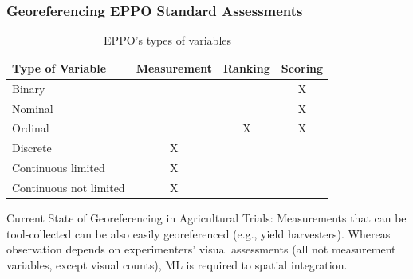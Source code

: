 \documentclass[aspectratio=43]{beamer}
\begin{document}
\begin{frame}
    \frametitle{Georeferencing EPPO Standard Assessments}
    
    \begin{table}[ht]
        \caption{\small EPPO's types of variables}
        \label{tab:data_types_slide}
        \centering
        \begin{tabular}{|l|c|c|c|}
        \hline
        \textbf{Type of Variable} & \textbf{Measurement} & \textbf{Ranking} & \textbf{Scoring} \\
        \hline
        \rowcolor{red!20} Binary & & & X \\
        \hline
        \rowcolor{red!20} Nominal & & & X \\
        \hline
        \rowcolor{red!20} Ordinal & & X & X \\
        \hline
        \rowcolor{yellow!20} Discrete & X & & \\
        \hline
        \rowcolor{green!20} Continuous limited & X & & \\
        \hline
        \rowcolor{green!20} Continuous not limited & X & & \\
        \hline
        \end{tabular}
        \end{table}
        
    \begin{flushleft}
        \hspace{1.5cm}{\tiny Summary from EPPO PP 1/152: Design and analysis of efficacy evaluation trials}
    \end{flushleft}

    \begin{block}{Current State of Georeferencing in Agricultural Trials:}
        \small Measurements that can be tool-collected can be also easily georeferenced (e.g., yield harvesters). Whereas observation depends on experimenters' visual assessments (all not measurement variables, except visual counts), ML is required to spatial integration.
    \end{block}
\end{frame}
\end{document}
